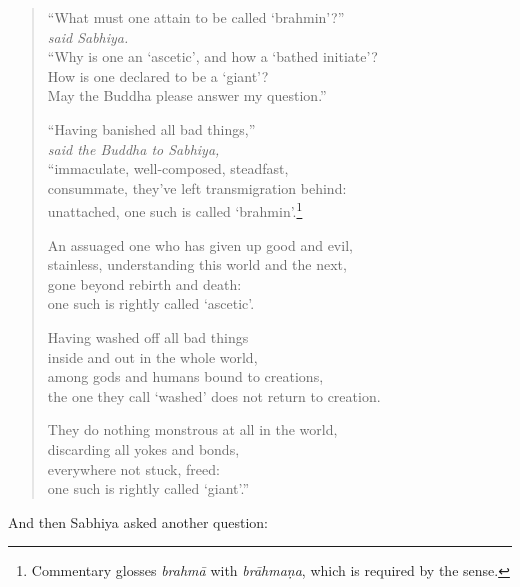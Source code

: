 \documentclass[12pt,openany]{book}%
\newcommand*{\scspeaker}[1]{\hspace{2em}\textit{#1}}
\begin{document}
\begin{verse}%
“What must one attain to be called ‘brahmin’?” \\
\scspeaker{said Sabhiya. }\\
“Why is one an ‘ascetic’, and how a ‘bathed initiate’? \\
How is one declared to be a ‘giant’? \\
May the Buddha please answer my question.” 

“Having banished all bad things,” \\
\scspeaker{said the Buddha to Sabhiya, }\\
“immaculate, well-composed, steadfast, \\
consummate, they’ve left transmigration behind: \\
unattached, one such is called ‘brahmin’.\footnote{Commentary glosses \textit{\textsanskrit{brahmā}} with \textit{\textsanskrit{brāhmaṇa}}, which is required by the sense. } 

An assuaged one who has given up good and evil, \\
stainless, understanding this world and the next, \\
gone beyond rebirth and death: \\
one such is rightly called ‘ascetic’. 

Having washed off all bad things \\
inside and out in the whole world, \\
among gods and humans bound to creations, \\
the one they call ‘washed’ does not return to creation. 

They do nothing monstrous at all in the world, \\
discarding all yokes and bonds, \\
everywhere not stuck, freed: \\
one such is rightly called ‘giant’.” 

%
\end{verse}

And then Sabhiya asked another question: 
\end{document}
